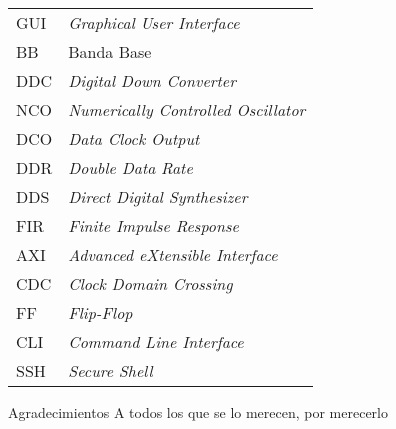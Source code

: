 \documentclass[screen, pagebackref,oneside]{ibtesis}
\begin{document}
\begin{preliminary}
\begin{abreviaturas}
\begin{table}[H]
\begin{tabular}{ll}
            GUI &   \textit{Graphical User Interface}   \\
            BB  &   Banda Base  \\
            DDC &   \textit{Digital Down Converter} \\
            NCO &   \textit{Numerically Controlled Oscillator}  \\
            DCO &   \textit{Data Clock Output}  \\
            DDR &   \textit{Double Data Rate}   \\
            DDS &   \textit{Direct Digital Synthesizer} \\
            FIR &   \textit{Finite Impulse Response}    \\
            AXI &   \textit{Advanced eXtensible Interface}  \\
            CDC &   \textit{Clock Domain Crossing}  \\
            FF  &   \textit{Flip-Flop}  \\
            CLI &   \textit{Command Line Interface} \\  
            SSH &   \textit{Secure Shell}
            \end{tabular}
        \end{table}    
    \end{abreviaturas}
    
    \tableofcontents                %
    \listoffigures                  %
    \listoftables                   %
    
    
\end{preliminary}











\appendix


\begin{biblio}
    
\end{biblio}

\begin{postliminary}

    \begin{seccion}{Agradecimientos}
    A todos los que se lo merecen, por merecerlo
    \end{seccion}
    
\end{postliminary}
    
\end{document}
